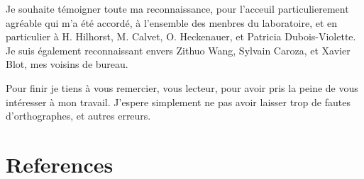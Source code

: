 \documentclass[a4paper,11pt]{article} %
\theoremstyle{plain}
\theoremstyle{definition}
\theoremstyle{remark}
\numberwithin{equation}{section}
\numberwithin{equation}{subsection}
\numberwithin{figure}{section}
\begin{document}
Je souhaite témoigner toute ma reconnaissance, pour l'acceuil particulierement agréable qui m'a été accordé, à l'ensemble des menbres du laboratoire, et en particulier à H. Hilhorst, M. Calvet, O. Heckenauer, et Patricia Dubois-Violette. Je suis également reconnaissant envers Zithuo Wang, Sylvain Caroza, et Xavier Blot, mes voisins de bureau.

Pour finir je tiens à vous remercier, vous lecteur, pour avoir pris la peine de vous intéresser à mon travail. J'espere simplement ne pas avoir laisser trop de fautes d'orthographes, et autres erreurs. 

\section{References}

\renewcommand{\section}[2]{}
\end{document}

